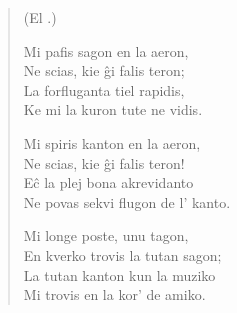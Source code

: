 \begin{verse}
\begin{center}
\footnotesize (El .)
\end{center}
                      Mi pafis sagon en la aeron,\\
                      Ne scias, kie \^gi falis teron;\\
                      La forfluganta tiel rapidis,\\
                      Ke mi la kuron tute ne vidis.

                      Mi spiris kanton en la aeron,\\
                      Ne scias, kie \^gi falis teron!\\
                      E\^c la plej bona akrevidanto\\
                      Ne povas sekvi flugon de l' kanto.

                      Mi longe poste, unu tagon,\\
                      En kverko trovis la tutan sagon;\\
                      La tutan kanton kun la muziko\\
                      Mi trovis en la kor' de amiko.

\end{verse}


\smallrule{}
